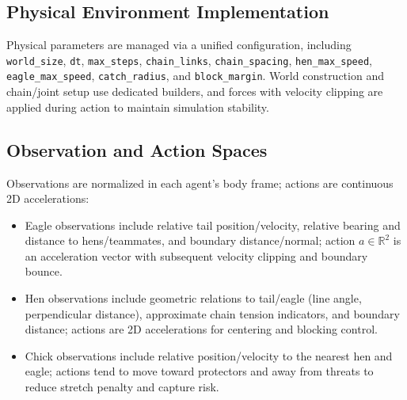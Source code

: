 \documentclass[12pt]{article}
\begin{document}
\subsection{Physical Environment Implementation}
Physical parameters are managed via a unified configuration, including \texttt{world\_size}, \texttt{dt}, \texttt{max\_steps}, \texttt{chain\_links}, \texttt{chain\_spacing}, \texttt{hen\_max\_speed}, \texttt{eagle\_max\_speed}, \texttt{catch\_radius}, and \texttt{block\_margin}. World construction and chain/joint setup use dedicated builders, and forces with velocity clipping are applied during action to maintain simulation stability.

\subsection{Observation and Action Spaces}
Observations are normalized in each agent’s body frame; actions are continuous 2D accelerations:
\begin{itemize}
\item Eagle observations include relative tail position/velocity, relative bearing and distance to hens/teammates, and boundary distance/normal; action \(a\in\mathbb{R}^2\) is an acceleration vector with subsequent velocity clipping and boundary bounce.
\item Hen observations include geometric relations to tail/eagle (line angle, perpendicular distance), approximate chain tension indicators, and boundary distance; actions are 2D accelerations for centering and blocking control.
\item Chick observations include relative position/velocity to the nearest hen and eagle; actions tend to move toward protectors and away from threats to reduce stretch penalty and capture risk.
\end{itemize}
\end{document}

